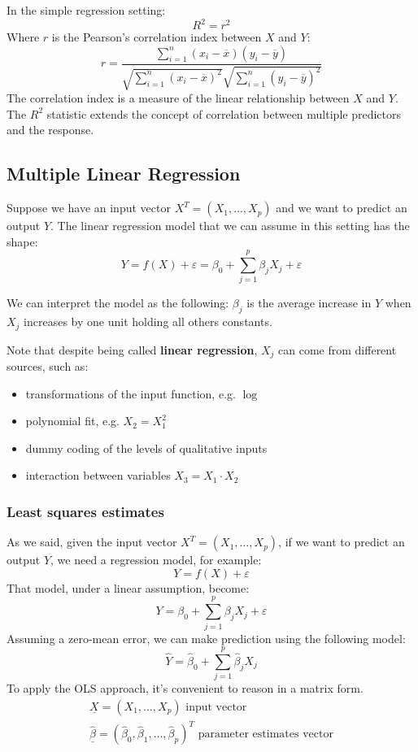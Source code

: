 In the simple regression setting:
\[
    R^2 = r^2
\]
Where $r$ is the Pearson's correlation index between $X$ and $Y$:
\[
    r = \frac{\sum_{i=1}^{n} (x_i - \overline{x})(y_i - \overline{y})}{\sqrt{\sum_{i=1}^{n} (x_i - \overline{x})^2} \sqrt{\sum_{i=1}^{n} (y_i - \overline{y})^2}}
\]
The correlation index is a measure of the linear relationship between $X$ and $Y$. The $R^2$ statistic extends the concept of correlation between multiple predictors and the response.

\subsection{Multiple Linear Regression}
Suppose we have an input vector $X^T = (X_1, \dots, X_p)$ and we want to predict an output $Y$. The linear regression model that we can assume in this setting has the shape:
\[
    Y = f(X) + \varepsilon = \beta_0 + \sum_{j=1}^{p} \beta_j X_j + \varepsilon
\]

We can interpret the model as the following: $\beta_j$ is the average increase in $Y$ when $X_j$ increases by one unit holding all others constants.

Note that despite being called \textbf{linear regression}, $X_j$ can come from different sources, such as:
\begin{itemize}
    \item transformations of the input function, e.g. $\log$
    \item polynomial fit, e.g. $X_2 = X_1^2$
    \item dummy coding of the levels of qualitative inputs
    \item interaction between variables $X_3 = X_1 \cdot X_2$
\end{itemize}


\subsubsection*{Least squares estimates}
As we said, given the input vector $X^T = (X_1, \dots, X_p)$, if we want to predict an output $Y$, we need a regression model, for example:
\[
    Y = f(X) + \varepsilon
\]
That model, under a linear assumption, become:
\[
    Y = \beta_0 + \sum_{j=1}^{p} \beta_j X_j + \varepsilon
\]
Assuming a zero-mean error, we can make prediction using the following model:
\[
    \hat{Y} = \hat{\beta}_0 + \sum_{j=1}^{p} \hat{\beta}_j X_j
\]
To apply the OLS approach, it's convenient to reason in a matrix form. 
\begin{gather*}
    \underline{X} = (X_1, \dots, X_p)\text{ input vector} \\
    \underline{\hat\beta} = (\hat\beta_0, \hat\beta_1, \dots, \hat\beta_p)^T\text{ parameter estimates vector} \\
\end{gather*}

